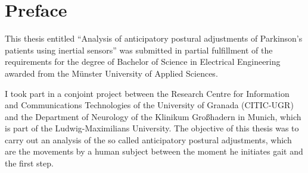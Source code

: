 \chapter*{Preface}

This thesis entitled ``Analysis of anticipatory postural adjustments of Parkinson's patients using inertial sensors'' was submitted in partial fulfillment of the requirements for the degree of Bachelor of Science in Electrical Engineering awarded from the Münster University of Applied Sciences.

I took part in a conjoint project between the Research Centre for Information and Communications Technologies of the University of Granada (CITIC-UGR) and the Department of Neurology of the Klinikum Großhadern in Munich, which is part of the Ludwig-Maximilians University. The objective of this thesis was to carry out an analysis of the so called anticipatory postural adjustments, which are the movements by a human subject between the moment he initiates gait and the first step.